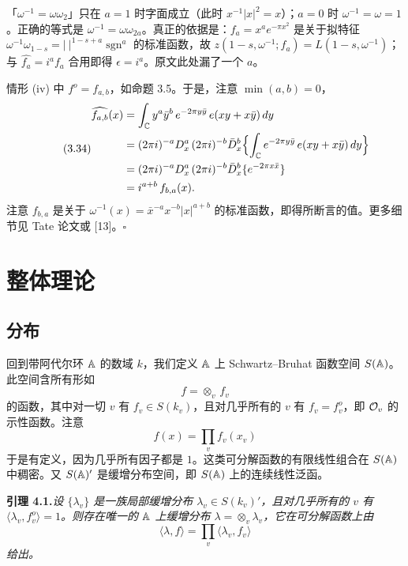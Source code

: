 \begin{annote}
「$\omega^{-1}=\omega\omega_2$」只在 $a=1$ 时字面成立（此时 $x^{-1}|x|^2=x$）；$a=0$ 时 $\omega^{-1}=\omega=1$。正确的等式是 $\omega^{-1}=\omega\omega_{2a}$。真正的依据是：$f_a=x^ae^{-\pi x^2}$ 是关于拟特征 $\omega^{-1}\omega_{1-s}=|\ |^{1-s+a}\operatorname{sgn}^a$ 的标准函数，故 $z(1-s,\omega^{-1};f_a)=L(1-s,\omega^{-1})$；与 $\widehat{f_a}=i^af_a$ 合用即得 $\epsilon=i^a$。原文此处漏了一个 $a$。
\par\vspace{0.15em}{\raggedleft 【来源：原书 p.~125（PDF 130）证明 (iii)；Tate 论文 §4（A）】\par}
\end{annote}

情形 (iv) 中 $f^o=f_{a,b}$，如命题 3.5。于是，注意 $\min(a,b)=0$，
\begin{equation*}\tag{3.34}
\begin{aligned}
\widehat{f_{a,b}}(x)&=\int_{\mathbb C}y^a\bar y^b\,e^{-2\pi y\bar y}\,e(xy+x\bar y)\,dy\\
&=(2\pi i)^{-a}D_x^a\,(2\pi i)^{-b}\bar D_x^b
\Bigl\{\int_{\mathbb C}e^{-2\pi y\bar y}\,e(xy+x\bar y)\,dy\Bigr\}\\
&=(2\pi i)^{-a}D_x^a\,(2\pi i)^{-b}\bar D_x^b\{e^{-2\pi x\bar x}\}\\
&=i^{a+b}\,f_{b,a}(x).
\end{aligned}
\end{equation*}
注意 $f_{b,a}$ 是关于 $\omega^{-1}(x)=\bar x^{-a}x^{-b}|x|^{a+b}$ 的标准函数，即得所断言的值。更多细节见 Tate 论文或 [13]。\hfill$\square$

\section{整体理论}

\subsection*{分布}

回到带阿代尔环 $\mathbb{A}$ 的数域 $k$，我们定义 $\mathbb{A}$ 上 Schwartz--Bruhat 函数空间 $S(\mathbb{A})$。此空间含所有形如
\[
f=\otimes_v\,f_v
\]
的函数，其中对一切 $v$ 有 $f_v\in S(k_v)$，且对几乎所有的 $v$ 有 $f_v=f_v^o$，即 $\mathcal{O}_v$ 的示性函数。注意
\[
f(x)=\prod_v f_v(x_v)
\]
于是有定义，因为几乎所有因子都是 $1$。这类可分解函数的有限线性组合在 $S(\mathbb{A})$ 中稠密。又 $S(\mathbb{A})'$ 是缓增分布空间，即 $S(\mathbb{A})$ 上的连续线性泛函。

\medskip\noindent\textbf{引理 4.1.}\quad \emph{设 $\{\lambda_v\}$ 是一族局部缓增分布 $\lambda_v\in S(k_v)'$，且对几乎所有的 $v$ 有 $\langle\lambda_v,f_v^o\rangle=1$。则存在唯一的 $\mathbb{A}$ 上缓增分布 $\lambda=\otimes_v\lambda_v$，它在可分解函数上由}
\[
\langle\lambda,f\rangle=\prod_v\langle\lambda_v,f_v\rangle
\]
\emph{给出。}

